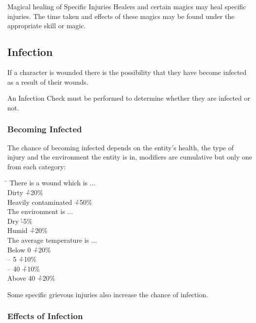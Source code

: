 \begin{multicols*}{3}
\begin{Description}
\item[Magical healing of Specific Injuries] Healers and certain magics may
heal specific injuries. The time taken and effects of these magics may
be found under the appropriate skill or magic.
\end{Description}

\subsection{Infection}
\label{adventure:infection}
If a character is wounded there is the possibility that they have
become infected as a result of their wounds.

An Infection Check must be performed to determine whether they are
infected or not.

\subsubsection{Becoming Infected}

The chance of becoming infected depends on the entity's health, the
type of injury and the environment the entity is in, modifiers are
cumulative but only one from each category:

\begin{tabbing}
\hspace{2em}\= \kill
There is a wound which is $\ldots$ \\
\> Dirty			\` +20\% \\
\> Heavily contaminated		\` +50\% \\
The environment is $\ldots$ \\
\> Dry   			\` -5\% \\
\> Humid			\` +20\% \\
The average temperature is $\ldots$ \\
\> Below 0			\` +20\% \\
 -- 5			\` +10\% \\
 -- 40			\` +10\% \\
\> Above 40			\` +20\% \\
\end{tabbing}

Some specific grievous injuries also increase the chance of infection.

\subsubsection{Effects of Infection}


\end{multicols*}

